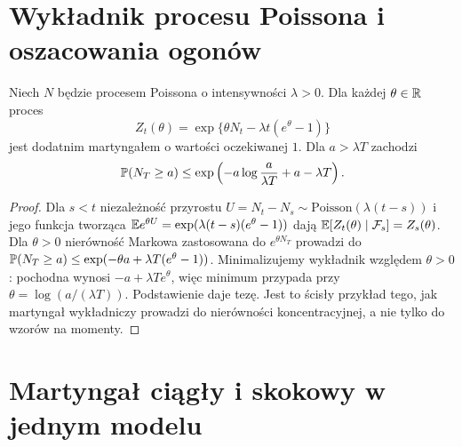 \section{Wykładnik procesu Poissona i oszacowania ogonów}
\begin{twierdzenie}
Niech $N$ będzie procesem Poissona o intensywności
$\lambda>0$. Dla każdej $\theta\in\mathbb{R}$ proces
\[
Z_t(\theta)=\exp\{\theta N_t-\lambda t(e^\theta-1)\}
\]
jest dodatnim martyngałem o wartości oczekiwanej $1$.
Dla $a>\lambda T$ zachodzi
\[
\mathbb{P}(N_T\ge a)\le
\exp\left(-a\log\frac{a}{\lambda T}+a-\lambda T\right).
\]
\end{twierdzenie}
\begin{proof}
Dla $s<t$ niezależność przyrostu
$U=N_t-N_s\sim\mathrm{Poisson}(\lambda(t-s))$
i jego funkcja tworząca
$\mathbb{E} e^{\theta U}=\exp(\lambda(t-s)(e^\theta-1))$
dają $\mathbb{E}[Z_t(\theta)\mid\mathcal{F}_s]=Z_s(\theta)$.
Dla $\theta>0$ nierówność Markowa zastosowana do
$e^{\theta N_T}$ prowadzi do
$\mathbb{P}(N_T\ge a)\le
\exp(-\theta a+\lambda T(e^\theta-1))$.
Minimalizujemy wykładnik względem $\theta>0$:
pochodna wynosi $-a+\lambda Te^\theta$, więc
minimum przypada przy $\theta=\log(a/(\lambda T))$.
Podstawienie daje tezę. Jest to ścisły przykład tego,
jak martyngał wykładniczy prowadzi do nierówności
koncentracyjnej, a nie tylko do wzorów na momenty.
\end{proof}

\section{Martyngał ciągły i skokowy w jednym modelu}

